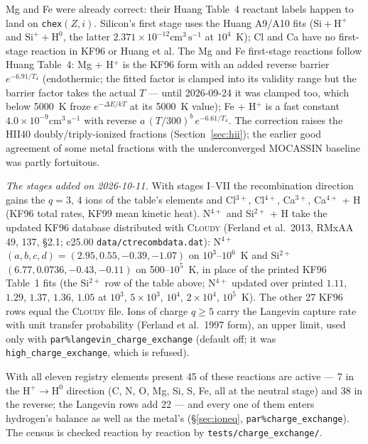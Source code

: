 \documentclass[english,a4paper]{my_memo}
\newcommand{\code}[1]{\texttt{#1}}
\newcommand{\cmc}{\mathrm{cm^{3}\,s^{-1}}}
\begin{document}
Mg and Fe were already correct: their Huang Table~4 reactant labels
happen to land on \code{chex}$(Z,i)$.  Silicon's first stage uses the
Huang A9/A10 fits ($\mathrm{Si} + \mathrm{H}^+$ and
$\mathrm{Si}^+ + \mathrm{H}^0$, the latter
$2.371{\times}10^{-12}\cmc$ at $10^4$~K); Cl and Ca have no first-stage
reaction in KF96 or Huang et al.  The Mg and Fe first-stage reactions follow Huang
Table~4: Mg + H$^+$ is the KF96 form with an added reverse barrier
$e^{-6.91/T_4}$ (endothermic; the fitted factor is clamped into its
validity range but the barrier factor takes the actual $T$ --- until
2026-09-24 it was clamped too, which below 5000~K froze
$e^{-\Delta E/kT}$ at its 5000~K value); Fe + H$^+$ is a fast constant
$4.0{\times}10^{-9}\cmc$ with reverse $a\,(T/300)^{b}\,e^{-6.61/T_4}$.
The correction raises the HII40 doubly/triply-ionized fractions
(Section~\ref{sec:hii}); the earlier good agreement of some metal
fractions with the underconverged MOCASSIN baseline was partly
fortuitous.

\emph{The stages added on 2026-10-11.}  With stages I--VII the
recombination direction gains the $q = 3$, 4 ions of the table's elements
and Cl$^{3+}$, Cl$^{4+}$, Ca$^{3+}$, Ca$^{4+}$ + H (KF96 total rates, KF99
mean kinetic heat).  N$^{4+}$ and Si$^{2+}$ + H take the updated KF96
database distributed with \textsc{Cloudy} (Ferland et al.\ 2013, RMxAA 49,
137, \S2.1; c25.00 \code{data/ctrecombdata.dat}): N$^{4+}$ $(a, b, c, d) =
(2.95, 0.55, -0.39, -1.07)$ on $10^3$--$10^6$~K and Si$^{2+}$ $(6.77,
0.0736, -0.43, -0.11)$ on 500--$10^5$~K, in place of the printed KF96
Table~1 fits (the Si$^{2+}$ row of the table above; N$^{4+}$ updated over
printed $1.11$, $1.29$, $1.37$, $1.36$, $1.05$ at $10^3$, $5{\times}10^3$,
$10^4$, $2{\times}10^4$, $10^5$~K).  The other 27 KF96 rows equal the
\textsc{Cloudy} file.  Ions of charge $q \ge 5$ carry the Langevin capture
rate with unit transfer probability (Ferland et al.\ 1997 form), an upper
limit, used only with \code{par\%langevin\_charge\_exchange} (default off;
it was \code{high\_charge\_exchange}, which is refused).

With all eleven registry elements present 45 of these reactions are active
--- 7 in the $\mathrm{H}^+ \to \mathrm{H}^0$ direction (C, N, O, Mg, Si,
S, Fe, all at the neutral stage) and 38 in the reverse; the Langevin rows
add 22 --- and every one of them enters hydrogen's balance as well as the
metal's (\S\ref{sec:ioneq}, \code{par\%charge\_exchange}).  The census is
checked reaction by reaction by \code{tests/charge\_exchange/}.
\end{document}
